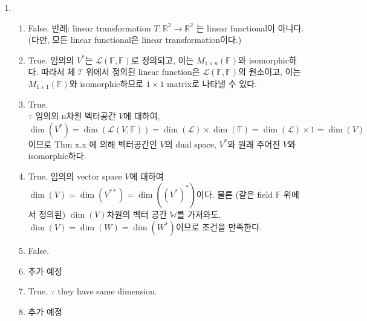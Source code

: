 \documentclass{oblivoir}
\begin{document}
\begin{enumerate}
    \item 
    \begin{enumerate}
        \item False. 반례: linear transformation $T:{\mathbb{R}}^2 \rightarrow {\mathbb{R}}^2$ 는 linear functional이 아니다. (다만, 모든 linear functional은 linear transformation이다.)
        \item True. 임의의 ${V}^*$는 $\mathcal{L}(\mathbb{F}, \mathbb{F})$로 정의되고, 이는 $M_{1\times n}(\mathbb{F})$와 isomorphic하다. 따라서 체 $\mathbb{F}$ 위에서 정의된 linear function은 $\mathcal{L}(\mathbb{F}, \mathbb{F})$의 원소이고, 이는 $M_{1\times 1}(\mathbb{F})$와 isomorphic하므로 $1\times1$ matrix로 나타낼 수 있다.
        \item True. \\
        $\because$ 임의의 n차원 벡터공간 $V$에 대하여, 
        \begin{equation}
            \dim(V^*) = \dim(\mathcal{L}(V, \mathbb{F})) = \dim(\mathcal{L}) \times \dim(\mathbb{F}) = \dim(\mathcal{L}) \times 1 = \dim(V)            
        \end{equation}
        이므로 Thm x.x 에 의해 벡터공간인 $V$의 dual space, $V^*$와 원래 주어진 $V$와 isomorphic하다.
        \item True. 임의의 vector space $V$에 대하여 $\dim(V) = \dim(V^{**}) = \dim({({V^*})}^*)$이다. 물론 (같은 field $\mathbb{F}$ 위에서 정의된) $\dim(V)$차원의 벡터 공간 $\mathbb{W}$를 가져와도, $\dim(V) = \dim(W) = \dim(W^*)$이므로 조건을 만족한다.
        \item False.
        \item 추가 예정
        \item True. $\because$ they have same dimension.
        \item 추가 예정
    \end{enumerate}
    

\end{enumerate}
\end{document}
